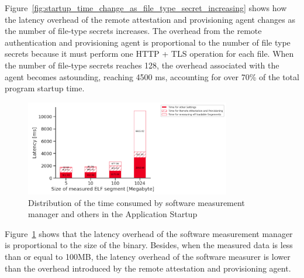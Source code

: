 Figure~\ref{fig:startup_time_change_as_file_type_secret_increasing} shows how the latency overhead of the remote attestation and provisioning agent changes as the number of file-type secrets increases. The overhead from the remote authentication and provisioning agent is proportional to the 
number of file type secrets because it must perform one HTTP + TLS operation for each file. When the number of file-type secrets reaches 128, the overhead associated with the agent becomes astounding, reaching 4500 ms, accounting for over 70\% of the total program startup time.
\begin{figure}[!htb]
    \centering
    \includegraphics[width=0.8\textwidth]{images/startup_time_change_as_elf_size_increasing.PNG}
    \caption[Distribution of the time consumed by software measurement manager and others in the Application Startup]{Distribution of the time consumed by software measurement manager and others in the Application Startup}
    \label{fig:startup_time_change_as_elf_size_increasing}
\end{figure}


Figure~\ref{fig:startup_time_change_as_elf_size_increasing} shows that the latency overhead of the software measurement manager is proportional to the size of the binary. Besides, when the measured data is less than or equal to 100MB, the latency overhead of the software measurer is lower than the 
overhead introduced by the remote attestation and provisioning agent.










